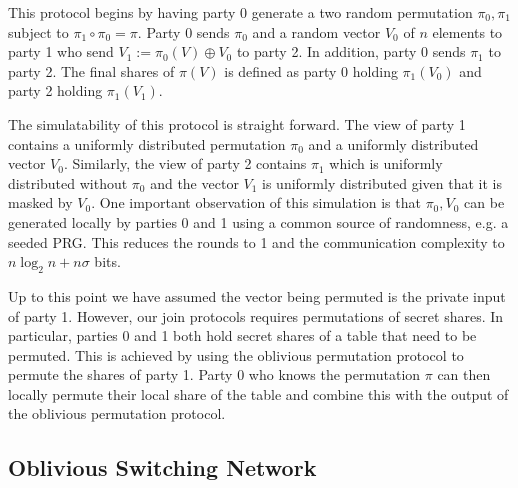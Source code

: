This protocol begins by having party 0 generate a two random permutation $\pi_0,\pi_1$ subject to $\pi_1 \circ \pi_0 = \pi$. Party 0 sends $\pi_0$ and a random vector $V_0$ of $n$ elements to party 1 who send $V_1 := \pi_0(V) \oplus V_0$ to party 2. In addition, party 0 sends $\pi_1$ to party 2. The final shares of $\pi(V)$ is defined as party 0 holding $\pi_1(V_0)$ and party 2 holding $\pi_1(V_1)$.

The simulatability of this protocol is straight forward. The view of party 1 contains a uniformly distributed permutation $\pi_0$ and a uniformly distributed vector $V_0$. Similarly, the view of party 2 contains $\pi_1$ which is uniformly distributed without $\pi_0$ and the vector $V_1$ is uniformly distributed given that it is masked by $V_0$. One important observation of this simulation is that $\pi_0,V_0$ can be generated locally by parties 0 and 1 using a common source of randomness, e.g. a seeded PRG. This reduces the rounds to 1 and the communication complexity to $n\log_2 n + n\sigma$ bits. 

Up to this point we have assumed the vector being permuted is the private input of party 1. However, our join protocols requires permutations of secret shares. In particular, parties 0 and 1 both hold secret shares of a table that need to be permuted. This is achieved by using the oblivious permutation protocol to permute the shares of party 1. Party 0 who knows the permutation $\pi$ can then locally permute their local share of the table and combine this with the output of the oblivious permutation protocol.


\subsection{Oblivious Switching Network}


